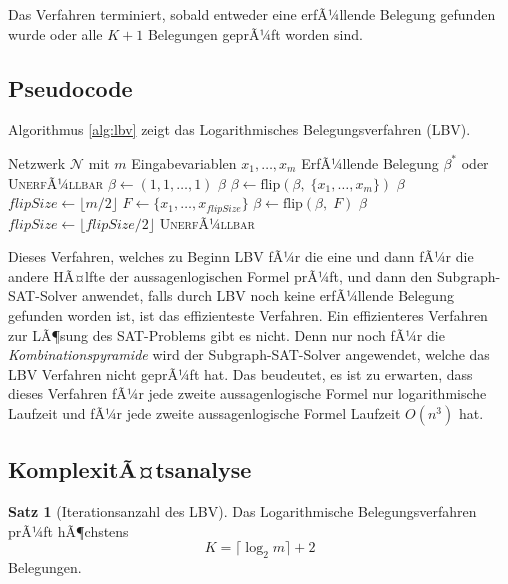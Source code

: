 ﻿\documentclass[a4paper,12pt]{article}
\theoremstyle{definition}
\newtheorem{satz}{Satz}
\begin{document}
Das Verfahren terminiert, sobald entweder eine erfÃ¼llende Belegung gefunden wurde oder
alle $K+1$ Belegungen geprÃ¼ft worden sind.

\subsection{Pseudocode}
Algorithmus \ref{alg:lbv} zeigt das Logarithmisches Belegungsverfahren (LBV).
\begin{algorithm}[H]
	\caption{Logarithmisches Belegungsverfahren (LBV)}
	\label{alg:lbv}
	\begin{algorithmic}[1]
		\Require Netzwerk $\mathcal{N}$ mit $m$ Eingabevariablen $x_1, \ldots, x_m$
		\Ensure ErfÃ¼llende Belegung $\beta^*$ oder \textsc{UnerfÃ¼llbar}
		\State $\beta \gets (1, 1, \ldots, 1)$ 
		 \Return $\beta$ \EndIf
		\State $\beta \gets \mathrm{flip}(\beta,\; \{x_1, \ldots, x_m\})$ 
		 \Return $\beta$ \EndIf
		\State $\mathit{flipSize} \gets \lfloor m/2 \rfloor$
		\State $F \gets \{x_1, \ldots, x_{\mathit{flipSize}}\}$
		\State $\beta \gets \mathrm{flip}(\beta,\; F)$
		 \Return $\beta$ \EndIf
		\State $\mathit{flipSize} \gets \lfloor \mathit{flipSize}/2 \rfloor$
		\EndWhile
		\State \Return \textsc{UnerfÃ¼llbar}
	\end{algorithmic}
\end{algorithm}

Dieses Verfahren, welches zu Beginn LBV fÃ¼r die eine und dann fÃ¼r die andere HÃ¤lfte der aussagenlogischen Formel prÃ¼ft, und dann den Subgraph-SAT-Solver anwendet, falls durch LBV noch keine erfÃ¼llende Belegung gefunden worden ist, ist das effizienteste Verfahren. Ein effizienteres Verfahren zur LÃ¶sung des SAT-Problems gibt es nicht. Denn nur noch fÃ¼r die \textit{Kombinationspyramide} wird der Subgraph-SAT-Solver angewendet, welche das LBV Verfahren nicht geprÃ¼ft hat. Das beudeutet, es ist zu erwarten, dass dieses Verfahren fÃ¼r jede zweite aussagenlogische Formel nur logarithmische Laufzeit und fÃ¼r jede zweite aussagenlogische Formel Laufzeit $O(n^3)$ hat.

\subsection{KomplexitÃ¤tsanalyse}

\begin{satz}[Iterationsanzahl des LBV]
	\label{satz:lbv-iterationen}
	Das Logarithmische Belegungsverfahren prÃ¼ft hÃ¶chstens
	\[
	K = \lceil \log_2 m \rceil + 2
	\]
	Belegungen.
\end{satz}
\end{document}
